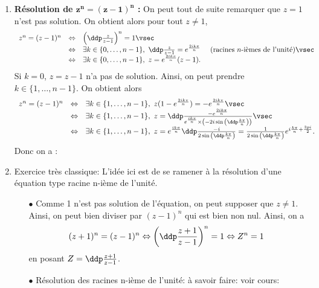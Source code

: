 
\begin{correction}   \;
\begin{enumerate}
\item  \textbf{R\'esolution de $\mathbf{z^n=(z-1)^n}$ :}
On peut tout de suite remarquer que $z=1$ n'est pas solution. On obtient alors pour tout $z\not= 1$,
$$\begin{array}{llll}
z^n=(z-1)^n&\Leftrightarrow & \left( \ddp\frac{z}{z-1} \right)^n=1\vsec\\
& \Leftrightarrow & \exists k\in\lbrace 0,\dots, n-1\rbrace,\ \ddp\frac{z}{z-1}=e^{\frac{2ik\pi}{n}}& \textmd{ (racines $n$-i\`emes de l'unit\'e)}\vsec\\
& \Leftrightarrow & \exists k\in\lbrace 0,\dots, n-1\rbrace,\ z=e^{\frac{2ik\pi}{n}}(z-1).
\end{array}$$
Si $k=0$, $z=z-1$ n'a pas de solution. Ainsi, on peut prendre $k\in\lbrace 1,\dots,n-1\rbrace$. On obtient alors
$$\begin{array}{lll}
z^n=(z-1)^n&\Leftrightarrow & \exists k\in\lbrace 1,\dots, n-1\rbrace,\ z(1-e^{\frac{2ik\pi}{n}})=-e^{\frac{2ik\pi}{n}}\vsec\\
&\Leftrightarrow & \exists k\in\lbrace 1,\dots, n-1\rbrace,\ z=\ddp\frac{-e^{\frac{2ik\pi}{n}}}{e^{\frac{ik\pi}{n}}\times \left(-2i\sin{\left( \ddp\frac{k\pi}{n}\right)}\right)   }\vsec\\
&\Leftrightarrow & \exists k\in\lbrace 1,\dots, n-1\rbrace,\ z=e^{\frac{ik\pi}{n}}\ddp\frac{-i}{2\sin{\left( \ddp\frac{k\pi}{n}\right)}} = \frac{1}{2\sin{\left( \ddp\frac{k\pi}{n}\right)}} e^{i\frac{k\pi}{n}+ \frac{3pi}{2}}.
\end{array}$$
Donc on a : 
\item Exercice tr\`{e}s classique: L'id\'ee ici est de se ramener \`{a} la r\'esolution d'une \'equation type racine n-i\`{e}me de l'unit\'e.
\begin{itemize}
\item[$\bullet$] Comme 1 n'est pas solution de l'\'equation, on peut supposer que $z\not= 1$. Ainsi, on peut bien diviser par $(z-1)^n$ qui est bien non nul. Ainsi, on a
$$(z+1)^n=(z-1)^n\Leftrightarrow \left( \ddp\frac{z+1}{z-1}\right)^n=1\Leftrightarrow Z^n=1$$
en posant $Z=\ddp\frac{z+1}{z-1}$.
\item[$\bullet$] R\'esolution des racines n-i\`{e}me de l'unit\'e: \`{a} savoir faire: voir cours:\\

\end{itemize}
\end{enumerate}
\end{correction}

